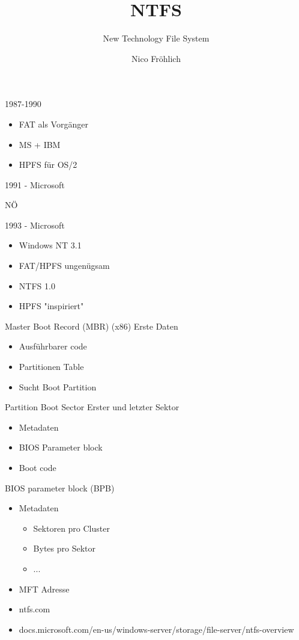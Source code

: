 \documentclass[12pt]{beamer}
\author{Nico Fröhlich}
\title{NTFS}
\subtitle{New Technology File System}
\begin{document}
\begin{frame}
\maketitle
\end{frame}

\begin{frame}{1987-1990}
\begin{itemize}
\item FAT als Vorgänger
\item MS + IBM
\item HPFS für OS/2
\end{itemize}
\end{frame}

\begin{frame}{1991 - Microsoft}
\begin{center}
\fontsize{48pt}{48pt}\selectfont
NÖ
\end{center}
\end{frame}

\begin{frame}{1993 - Microsoft}
\begin{itemize}
\item Windows NT 3.1
\item FAT/HPFS ungenügsam
\item NTFS 1.0
\item HPFS "inspiriert"
\end{itemize}
\end{frame}

\begin{frame}{Master Boot Record (MBR) (x86)}
\Large
Erste Daten
\begin{itemize}
\item Ausführbarer code
\item Partitionen Table
\item Sucht Boot Partition
\end{itemize}
\end{frame}

\begin{frame}{Partition Boot Sector}
\Large
Erster und letzter Sektor
\begin{itemize}
\item Metadaten
\item BIOS Parameter block
\item Boot code
\end{itemize}
\end{frame}

\begin{frame}{BIOS parameter block (BPB)}
\begin{itemize}
\item Metadaten
\begin{itemize}
\item Sektoren pro Cluster
\item Bytes pro Sektor
\item ...
\end{itemize}
\item MFT Adresse
\end{itemize}
\end{frame}

\begin{frame}
\small
\begin{itemize}
\small
\item ntfs.com
\item docs.microsoft.com/en-us/windows-server/storage/file-server/ntfs-overview
\end{itemize}
\end{frame}
\end{document}
